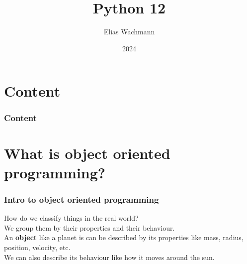 \documentclass{beamer}
\title[]
{Python 12}
\author[E.~Wachmann]{\scriptsize Elias Wachmann
}
\date{2024} %
\institute[Institute of Theoretical and Computational Physics]
{
}
\begin{document}
\titleframe

\section*{Content}

\begin{frame}
\frametitle{Content}
  \tableofcontents
\end{frame}
\section{What is object oriented programming?}
\begin{frame}
  \frametitle{Intro to object oriented programming}
  How do we classify things in the real world?\\
  \vspace{5mm}
  We group them by their properties and their behaviour.\\
  \vspace{5mm}
  An \textbf{object} like a planet is can be described by its properties like mass, radius, position, velocity, etc.\\
  \vspace{5mm}
  We can also describe its behaviour like how it moves around the sun.\\
\end{frame}
\end{document}
